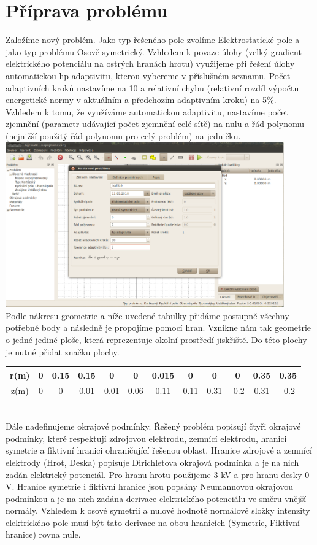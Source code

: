 \documentclass[a4paper, oneside]{article}
\begin{document}
\section{Příprava problému}
Založíme nový problém. Jako typ řešeného pole zvolíme Elektrostatické pole a jako typ problému Osově symetrický. Vzhledem k povaze úlohy (velký gradient elektrického potenciálu na ostrých hranách hrotu) využijeme při řešení úlohy automatickou hp-adaptivitu, kterou vybereme v příslušném seznamu. Počet adaptivních kroků nastavíme na 10 a relativní chybu (relativní rozdíl výpočtu energetické normy v aktuálním a předchozím adaptivním kroku) na 5\%. Vzhledem k tomu, že využíváme automatickou adaptivitu, nastavíme počet zjemnění (parametr udávající počet zjemnění celé sítě) na nulu a řád polynomu (nejnižší použitý řád polynomu pro celý problém) na jedničku.\\
\includegraphics[width=12cm]{Nastaveni_problemu.eps}\\
Podle nákresu geometrie a níže uvedené tabulky přidáme postupně všechny potřebné body a následně je propojíme pomocí hran. Vznikne nám tak geometrie o jedné jediné ploše, která reprezentuje okolní prostředí jiskřiště. Do této plochy je nutné přidat značku plochy.\\
\begin{tabular}{|c|c|c|c|c|c|c|c|c|c|c|c|}
\hline
r(m) & 0 & 0.15 & 0.15 & 0 & 0 & 0.015 & 0 & 0 & 0 & 0.35 & 0.35\\
\hline
z(m) & 0 & 0 & 0.01 & 0.01 & 0.06 & 0.11 & 0.11 & 0.31 & -0.2 & 0.31 & -0.2\\
\hline 
\end{tabular} \\
Dále nadefinujeme okrajové podmínky. Řešený problém popisují čtyři okrajové podmínky, které respektují zdrojovou elektrodu, zemnící elektrodu, hranici symetrie a fiktivní hranici ohraničující řešenou oblast. Hranice zdrojové a zemnící elektrody (Hrot, Deska) popisuje Dirichletova okrajová podmínka a je na nich zadán elektrický potenciál. Pro hranu hrotu použijeme 3 kV a pro hranu desky 0 V. Hranice symetrie i fiktivní hranice jsou popsány Neumannovou okrajovou podmínkou a je na nich zadána derivace elektrického potenciálu ve směru vnější normály. Vzhledem k osové symetrii a nulové hodnotě normálové složky intenzity elektrického pole musí být tato derivace na obou hranicích (Symetrie, Fiktivní hranice) rovna nule.\\
\end{document}
